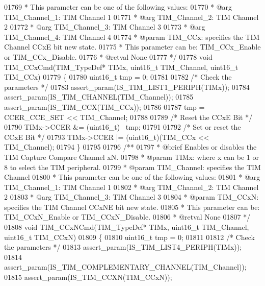 \begin{DoxyCode}
01769 \textcolor{comment}{  *          This parameter can be one of the following values:}
01770 \textcolor{comment}{  *            @arg TIM\_Channel\_1: TIM Channel 1}
01771 \textcolor{comment}{  *            @arg TIM\_Channel\_2: TIM Channel 2}
01772 \textcolor{comment}{  *            @arg TIM\_Channel\_3: TIM Channel 3}
01773 \textcolor{comment}{  *            @arg TIM\_Channel\_4: TIM Channel 4}
01774 \textcolor{comment}{  * @param  TIM\_CCx: specifies the TIM Channel CCxE bit new state.}
01775 \textcolor{comment}{  *          This parameter can be: TIM\_CCx\_Enable or TIM\_CCx\_Disable. }
01776 \textcolor{comment}{  * @retval None}
01777 \textcolor{comment}{  */}
01778 \textcolor{keywordtype}{void} TIM_CCxCmd(TIM\_TypeDef* TIMx, uint16\_t TIM\_Channel, uint16\_t TIM\_CCx)
01779 \{
01780   uint16\_t tmp = 0;
01781 
01782   \textcolor{comment}{/* Check the parameters */}
01783   assert_param(IS\_TIM\_LIST1\_PERIPH(TIMx));
01784   assert_param(IS\_TIM\_CHANNEL(TIM\_Channel));
01785   assert_param(IS\_TIM\_CCX(TIM\_CCx));
01786 
01787   tmp = CCER_CCE_SET << TIM\_Channel;
01788 
01789   \textcolor{comment}{/* Reset the CCxE Bit */}
01790   TIMx->CCER &= (uint16\_t)~ tmp;
01791 
01792   \textcolor{comment}{/* Set or reset the CCxE Bit */}
01793   TIMx->CCER |=  (uint16\_t)(TIM\_CCx << TIM\_Channel);
01794 \}
01795 
01796 \textcolor{comment}{/**}
01797 \textcolor{comment}{  * @brief  Enables or disables the TIM Capture Compare Channel xN.}
01798 \textcolor{comment}{  * @param  TIMx: where x can be 1 or 8 to select the TIM peripheral.}
01799 \textcolor{comment}{  * @param  TIM\_Channel: specifies the TIM Channel}
01800 \textcolor{comment}{  *          This parameter can be one of the following values:}
01801 \textcolor{comment}{  *            @arg TIM\_Channel\_1: TIM Channel 1}
01802 \textcolor{comment}{  *            @arg TIM\_Channel\_2: TIM Channel 2}
01803 \textcolor{comment}{  *            @arg TIM\_Channel\_3: TIM Channel 3}
01804 \textcolor{comment}{  * @param  TIM\_CCxN: specifies the TIM Channel CCxNE bit new state.}
01805 \textcolor{comment}{  *          This parameter can be: TIM\_CCxN\_Enable or TIM\_CCxN\_Disable. }
01806 \textcolor{comment}{  * @retval None}
01807 \textcolor{comment}{  */}
01808 \textcolor{keywordtype}{void} TIM_CCxNCmd(TIM\_TypeDef* TIMx, uint16\_t TIM\_Channel, uint16\_t TIM\_CCxN)
01809 \{
01810   uint16\_t tmp = 0;
01811 
01812   \textcolor{comment}{/* Check the parameters */}
01813   assert_param(IS\_TIM\_LIST4\_PERIPH(TIMx));
01814   assert_param(IS\_TIM\_COMPLEMENTARY\_CHANNEL(TIM\_Channel));
01815   assert_param(IS\_TIM\_CCXN(TIM\_CCxN));

\end{DoxyCode}
